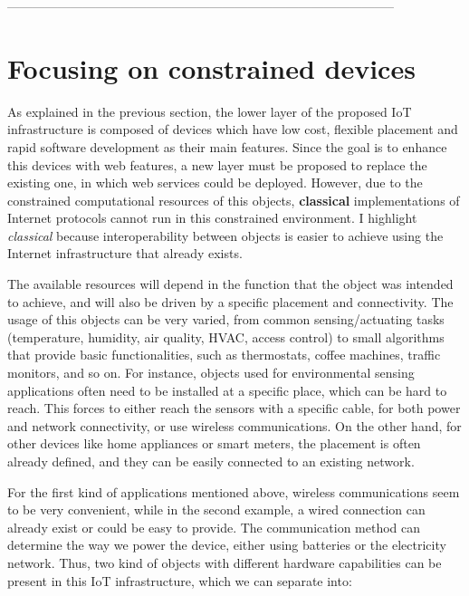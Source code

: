 --------------------------------------------------------------------------------------------\\


\section{Focusing on constrained devices}
As explained in the previous section, the lower layer of the proposed IoT infrastructure is composed of devices which have low cost, flexible placement and rapid software development as their main features.
Since the goal is to enhance this devices with web features, a new layer must be proposed to replace the existing one, in which web services could be deployed.
However, due to the constrained computational resources of this objects, \textbf{classical} implementations of Internet protocols cannot run in this constrained environment.
I highlight \textit{classical} because interoperability between objects is easier to achieve using the Internet infrastructure that already exists.

The available resources will depend in the function that the object was intended to achieve, and will also be driven by a specific placement and connectivity.
The usage of this objects can be very varied, from common sensing/actuating tasks (temperature, humidity, air quality, HVAC, access control) to small algorithms that provide basic functionalities, such as thermostats, coffee machines, traffic monitors, and so on.
For instance, objects used for environmental sensing applications often need to be installed at a specific place\cite{younis2008placement}, which can be hard to reach. 
This forces to either reach the sensors with a specific cable, for both power and network connectivity, or use wireless communications.
On the other hand, for other devices like home appliances or smart meters, the placement is often already defined, and they can be easily connected to an existing network.

For the first kind of applications mentioned above, wireless communications seem to be very convenient, while in the second example, a wired connection can already exist or could be easy to provide.
The communication method can determine the way we power the device, either using batteries or the electricity network.
Thus, two kind of objects with different hardware capabilities can be present in this IoT infrastructure, which we can separate into:


